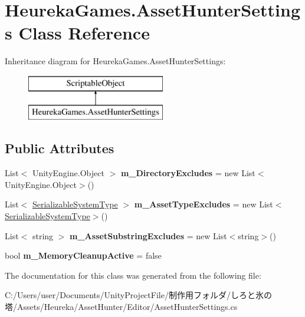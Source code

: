 \hypertarget{class_heureka_games_1_1_asset_hunter_settings}{}\section{Heureka\+Games.\+Asset\+Hunter\+Settings Class Reference}
\label{class_heureka_games_1_1_asset_hunter_settings}
Inheritance diagram for Heureka\+Games.\+Asset\+Hunter\+Settings\+:\begin{figure}[H]
\begin{center}
\leavevmode
\includegraphics[height=2.000000cm]{class_heureka_games_1_1_asset_hunter_settings}
\end{center}
\end{figure}
\subsection*{Public Attributes}
\begin{DoxyCompactItemize}
\item 
\mbox{\label{class_heureka_games_1_1_asset_hunter_settings_a7f64ef2d750ce2ac11352be1fcfc6e87}} 
List$<$ Unity\+Engine.\+Object $>$ {\bfseries m\+\_\+\+Directory\+Excludes} = new List$<$Unity\+Engine.\+Object$>$()
\item 
\mbox{\label{class_heureka_games_1_1_asset_hunter_settings_a5cab622c7146daf4faa4690a1081215f}} 
List$<$ \hyperlink{class_heureka_games_1_1_serializable_system_type}{Serializable\+System\+Type} $>$ {\bfseries m\+\_\+\+Asset\+Type\+Excludes} = new List$<$\hyperlink{class_heureka_games_1_1_serializable_system_type}{Serializable\+System\+Type}$>$()
\item 
\mbox{\label{class_heureka_games_1_1_asset_hunter_settings_a01114e5c3c0947c8d6847bdafb7d87ae}} 
List$<$ string $>$ {\bfseries m\+\_\+\+Asset\+Substring\+Excludes} = new List$<$string$>$()
\item 
\mbox{\label{class_heureka_games_1_1_asset_hunter_settings_a9e806a8bdc8505c6b72a8585aa9959f0}} 
bool {\bfseries m\+\_\+\+Memory\+Cleanup\+Active} = false
\end{DoxyCompactItemize}


The documentation for this class was generated from the following file\+:\begin{DoxyCompactItemize}
\item 
C\+:/\+Users/user/\+Documents/\+Unity\+Project\+File/制作用フォルダ/しろと氷の塔/\+Assets/\+Heureka/\+Asset\+Hunter/\+Editor/Asset\+Hunter\+Settings.\+cs\end{DoxyCompactItemize}
